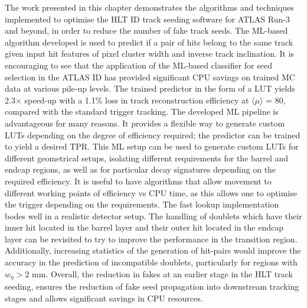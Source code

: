 The work presented in this chapter demonstrates the algorithms and techniques implemented to optimise the HLT ID track seeding software for ATLAS Run-3 and beyond, in order to reduce the number of fake track seeds. The ML-based algorithm developed is used to predict if a pair of hits belong to the same track given input hit features of pixel cluster width and inverse track inclination. It is encouraging to see that the application of the ML-based classifier for seed selection in the ATLAS ID has provided significant CPU savings on trained MC data at various pile-up levels. The trained predictor in the form of a LUT yields 2.3$\times$ speed-up with a 1.1\% loss in track reconstruction efficiency at $\langle \mu \rangle$ = 80, compared with the standard trigger tracking. The developed ML pipeline is advantageous for many reasons. It provides a flexible way to generate custom LUTs depending on the degree of efficiency required; the predictor can be trained to yield a desired TPR. This ML setup can be used to generate custom LUTs for different geometrical setups, isolating different requirements for the barrel and endcap regions, as well as for particular decay signatures depending on the required efficiency. It is useful to have algorithms that allow movement to different working points of efficiency vs CPU time, as this allows one to optimise the trigger depending on the requirements. The fast lookup implementation bodes well in a realistic detector setup. The handling of doublets which have their inner hit located in the barrel layer and their outer hit located in the endcap layer can be revisited to try to improve the performance in the transition region. Additionally, increasing statistics of the generation of hit-pairs would improve the accuracy in the prediction of incompatible doublets, particularly for regions with $w_{\eta} > 2$ mm. Overall, the reduction in fakes at an earlier stage in the HLT track seeding, ensures the reduction of fake seed propagation into downstream tracking stages and allows significant savings in CPU resources.


